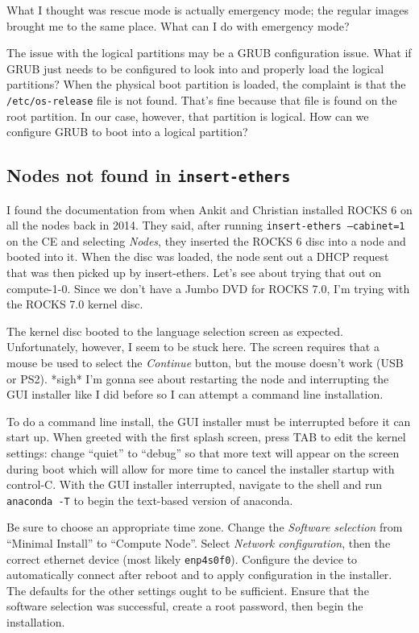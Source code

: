 \documentclass[12pt]{article}
\begin{document}
\qq What I thought was rescue mode is actually emergency mode; the regular
images brought me to the same place. What can I do with emergency mode?

\qq The issue with the logical partitions may be a GRUB configuration
issue. What if GRUB just needs to be configured to look into and properly load
the logical partitions? When the physical boot partition is loaded, the
complaint is that the {\tt /etc/os-release} file is not found. That's fine
because that file is found on the root partition. In our case, however, that
partition is logical. How can we configure GRUB to boot into a logical
partition?

\subsection{Nodes not found in {\tt insert-ethers}}

\qq I found the documentation from when Ankit and Christian installed ROCKS 6 on
all the nodes back in 2014. They said, after running {\tt insert-ethers
  --cabinet=1} on the CE and selecting \textit{Nodes}, they inserted the ROCKS 6
disc into a node and booted into it. When the disc was loaded, the node sent out
a DHCP request that was then picked up by insert-ethers. Let's see about trying
that out on compute-1-0. Since we don't have a Jumbo DVD for ROCKS 7.0, I'm
trying with the ROCKS 7.0 kernel disc. 

\qq The kernel disc booted to the language selection screen as
expected. Unfortunately, however, I seem to be stuck here. The screen requires
that a mouse be used to select the \textit{Continue} button, but the mouse
doesn't work (USB or PS2). *sigh* I'm gonna see about restarting the node and
interrupting the GUI installer like I did before so I can attempt a command line
installation. 

\qq To do a command line install, the GUI installer must be interrupted before
it can start up. When greeted with the first splash screen, press TAB to edit
the kernel settings: change ``quiet'' to ``debug'' so that more text will appear
on the screen during boot which will allow for more time to cancel the installer
startup with control-C. With the GUI installer interrupted, navigate to the
shell and run {\tt anaconda -T} to begin the text-based version of
anaconda.

\qq Be sure to choose an appropriate time zone. Change the \textit{Software
  selection} from ``Minimal Install'' to ``Compute Node''. Select
\textit{Network configuration}, then the correct ethernet device (most
likely {\tt enp4s0f0}). Configure the device to automatically connect after
reboot and to apply configuration in the installer. The defaults for the other
settings ought to be sufficient. Ensure that the software selection was
successful, create a root password, then begin the installation.
\end{document}
